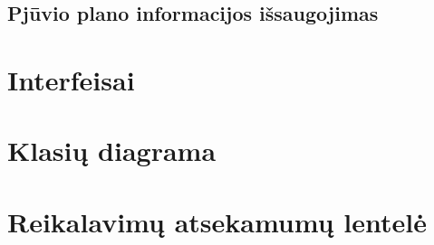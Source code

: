 \documentclass[a4paper,12pt]{article}
\begin{document}
\subsection{ Pjūvio plano informacijos išsaugojimas }



\section{Interfeisai}


\section{Klasių diagrama}


\section{Reikalavimų atsekamumų lentelė}
\end{document}
